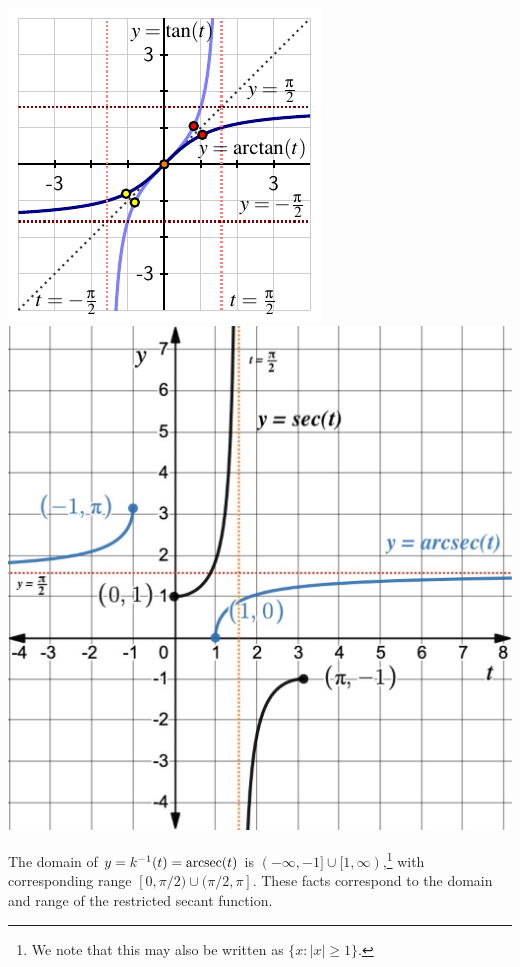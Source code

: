 \documentclass{ximera}
\begin{document}
\begin{summary}
\begin{itemize}
\begin{image}
\includegraphics[width = .49\linewidth]{inverse-trig-arctan-graph.pdf}
\includegraphics[width=.49\linewidth]{secArcsecGraphst.pdf}
\end{image}
\par
The domain of $y = k^{-1}(t) = \operatorname{arcsec}(t)$ is $(-\infty,-1] \cup [1,\infty)$,\footnote{We note that this may also be written as $\{x: |x| \geq 1\}$.} with corresponding range $[0,\pi/2) \cup (\pi/2, \pi]$. These facts correspond to the domain and range of the restricted secant function.
%
\end{itemize}
\end{summary}
\end{document}
